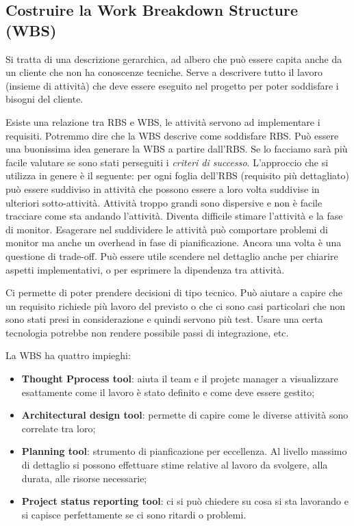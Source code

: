 \subsection{Costruire la Work Breakdown Structure (WBS)}
Si tratta di una descrizione gerarchica, ad albero che può essere capita anche da un cliente che non ha conoscenze tecniche.
Serve a descrivere tutto il lavoro (insieme di attività) che deve essere eseguito nel progetto per poter soddisfare i bisogni del cliente.

\noindent Esiste una relazione tra RBS e WBS, le attività servono ad implementare i requisiti. Potremmo dire che la WBS descrive come soddisfare RBS.\noindent
Può essere una buonissima idea generare la WBS a partire dall'RBS. Se lo facciamo sarà più facile valutare se sono stati perseguiti i \textit{criteri di successo}.\newline
\noindent L'approccio che si utilizza in genere è il seguente: per ogni foglia dell'RBS (requisito più dettagliato) può essere suddiviso in attività che possono essere a loro volta suddivise in ulteriori sotto-attività. Attività troppo grandi sono dispersive e non è facile tracciare come sta andando l'attività. Diventa difficile stimare l'attività e la fase di monitor.\newline
Esagerare nel suddividere le attività può comportare problemi di monitor ma anche un overhead in fase di pianificazione. Ancora una volta è una questione di trade-off. Può essere utile scendere nel dettaglio anche per chiarire aspetti implementativi, o per esprimere la dipendenza tra attività.

\begin{info}
	Ci permette di poter prendere decisioni di tipo tecnico. Può aiutare a capire che un requisito richiede più lavoro del previsto o che ci sono casi particolari che non sono stati presi in considerazione e quindi servono più test. Usare una certa tecnologia potrebbe non rendere possibile passi di integrazione, etc.
\end{info}

La WBS ha quattro impieghi:
\begin{itemize}
	\item \textbf{Thought Pprocess tool}: aiuta il team e il projetc manager a visualizzare esattamente come il lavoro è stato definito e come deve essere gestito;
	\item \textbf{Architectural design tool}: permette di capire come le diverse attività sono correlate tra loro;
	\item \textbf{Planning tool}: strumento di pianficazione per eccellenza. Al livello massimo di dettaglio si possono effettuare stime relative al lavoro da svolgere, alla durata, alle risorse necessarie;
	\item \textbf{Project status reporting tool}: ci si può chiedere su cosa si sta lavorando e si capisce perfettamente se ci sono ritardi o problemi.
\end{itemize}

